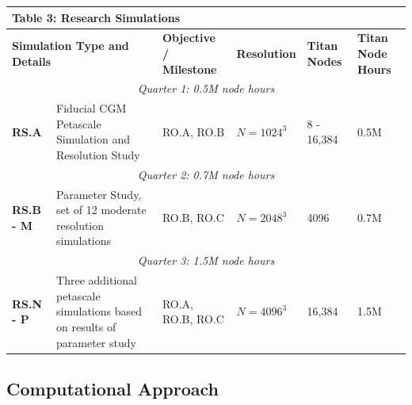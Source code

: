 \documentclass[11pt,letterpaper,english]{article}
\begin{document}
\begin{table}[h]
\vspace{-.12in}
\begin{tabular}{|l|p{2in}|p{1in}|p{0.7in}|p{0.5in}|p{0.7in}|} 
\multicolumn{6}{l}{\bf{Table 3: Research Simulations}}\\
\hline
\multicolumn{2}{|l|}{\bf Simulation Type and Details} & {\bf Objective / Milestone} & {\bf Resolution} & {\bf Titan Nodes} & {\bf Titan Node Hours} \\ \hline
\multicolumn{6}{|c|}{\it Quarter 1: 0.5M node hours} \\ \hline
\textbf{RS.A} & Fiducial CGM Petascale Simulation and Resolution Study & RO.A, RO.B & $N=1024^3$ & 8 - 16,384 & 0.5M\\ \hline
\multicolumn{6}{|c|}{\it Quarter 2: 0.7M node hours} \\ \hline
\textbf{RS.B - M} & Parameter Study, set of 12 moderate resolution simulations & RO.B, RO.C & $N=2048^3$ & 4096 & 0.7M\\ \hline
\multicolumn{6}{|c|}{\it Quarter 3: 1.5M node hours} \\ \hline
\textbf{RS.N - P} & Three additional petascale simulations based on results of parameter study & RO.A, RO.B, RO.C & $N=4096^3$ & 16,384 & 1.5M\\ \hline
\end{tabular}
\end{table}


\vspace{-.25in}
\subsection{Computational Approach}
\vspace{-.2in}


\end{document}
